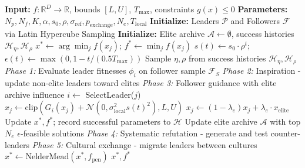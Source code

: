 \documentclass[11pt]{article}
\begin{document}
\begin{algorithm}[h]
\caption{Sociocultural Dynamics Metaheuristic (SDM) - Main Framework}
\label{alg:sdm_main}
\small
\begin{algorithmic}[1]
\State \textbf{Input:} $f: \mathbb{R}^D \to \mathbb{R}$, bounds $[L, U]$, $T_{\max}$, constraints $g(x) \leq 0$
\State \textbf{Parameters:} $N_p, N_f, K, \alpha, s_0, \rho, \sigma_{\text{ref}}, p_{\text{exchange}}, N_e, T_{\text{local}}$
\State \textbf{Initialize:} Leaders $\mathcal{P}$ and Followers $\mathcal{F}$ via Latin Hypercube Sampling
\State \textbf{Initialize:} Elite archive $\mathcal{A} \leftarrow \emptyset$, success histories $\mathcal{H}_\eta, \mathcal{H}_\rho$
\State $x^* \leftarrow \arg\min_j f(x_j)$; $f^* \leftarrow \min_j f(x_j)$
    \State $s(t) \leftarrow s_0 \cdot \rho^t$; $\epsilon(t) \leftarrow \max(0, 1 - t/(0.5 T_{\max}))$ 
    \State Sample $\eta, \rho$ from success histories $\mathcal{H}_\eta, \mathcal{H}_\rho$ 
    \State \textit{Phase 1:} Evaluate leader fitnesses $\phi_i$ on follower sample $\mathcal{F}_S$
    \State \textit{Phase 2:} Inspiration - update non-elite leaders toward elites
    \State \textit{Phase 3:} Follower guidance with elite archive influence
        \State $i \leftarrow$ SelectLeader($j$) 
        \State $x_j \leftarrow \text{clip}(G_i(x_j) + \mathcal{N}(0, \sigma_{\text{local}}^2 s(t)^2), L, U)$
         $x_j \leftarrow (1-\lambda_e) x_j + \lambda_e \cdot x_{\text{elite}}$ \EndIf {}
    \EndFor
     Update $x^*, f^*$; record successful parameters to $\mathcal{H}$ \EndIf
    \State Update elite archive $\mathcal{A}$ with top $N_e$ $\epsilon$-feasible solutions
    \State \textit{Phase 4:} Systematic refutation - generate and test counter-leaders
    \State \textit{Phase 5:} Cultural exchange - migrate leaders between cultures
     $x^* \leftarrow \text{NelderMead}(x^*, f_{\text{pen}})$ \EndIf {}
\EndFor
\State \Return $x^*, f^*$
\end{algorithmic}
\end{algorithm}
\end{document}
